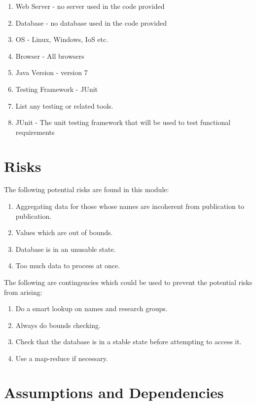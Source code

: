 \begin{enumerate} 
	\item Web Server - no server used in the code provided
	\item Database - no database used in the code provided
	\item OS - Linux, Windows, IoS etc.
	\item Browser - All browsers
	\item Java Version - version 7
	\item Testing Framework - JUnit
	\item List any testing or related tools.
	\item JUnit - The unit testing framework that will be used to test functional requirements
\end{enumerate}

\section{Risks}
	The following potential risks are found in this module:
\begin{enumerate}
	\item Aggregating data for those whose names are incoherent from publication to publication.
	\item Values  which are out of bounds.
	\item Database is in an unusable state.
	\item Too much data to process at once.
\end{enumerate}

	The following are contingencies which could be used to prevent the potential risks from arising:
\begin{enumerate}

	\item Do a smart lookup on names and research groups.
	\item Always do bounds checking.
	\item Check that the database is in a stable state before attempting to access it.
	\item Use a map-reduce if necessary.
         

\end{enumerate} 

\section{Assumptions and Dependencies}

